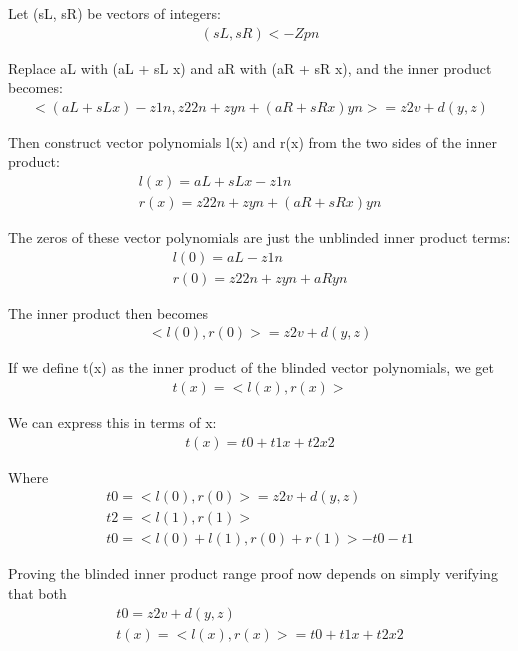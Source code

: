 \documentclass{article}
\begin{document}
Let (sL, sR) be vectors of integers:
\begin{eqnarray}
  (sL, sR) <- Zpn
\end{eqnarray}

Replace aL with (aL + sL x) and aR with (aR + sR x), and the inner product becomes:
\begin{eqnarray}
  <(aL + sL x) - z 1n, z2 2n + z yn + (aR+ sR x)yn> = z2 v + d(y,z)
\end{eqnarray}

Then construct vector polynomials l(x) and r(x) from the two sides of the inner product:
\begin{eqnarray}
  l(x) = aL + sL x - z 1n\\
  r(x) = z2 2n + z yn + (aR+ sR x)yn
\end{eqnarray}

The zeros of these vector polynomials are just the unblinded inner product terms:
\begin{eqnarray}
  l(0) = aL - z 1n\\
  r(0) = z2 2n + z yn + aRyn
\end{eqnarray}

The inner product then becomes
\begin{eqnarray}
  <l(0), r(0)> = z2 v + d(y,z)
\end{eqnarray}

If we define t(x) as the inner product of the blinded vector polynomials, we get
\begin{eqnarray}
  t(x) = <l(x), r(x)> 
\end{eqnarray}

We can express this in terms of x:
\begin{eqnarray}
  t(x) = t0 + t1 x + t2 x2
\end{eqnarray}

Where
\begin{eqnarray}
  t0 = <l(0), r(0)> = z2 v + d(y,z)\\
  t2 = <l(1), r(1)>\\
  t0 = <l(0) + l(1), r(0) + r(1)> - t0 - t1
\end{eqnarray}

Proving the blinded inner product range proof now depends on simply verifying that both 
\begin{eqnarray}
  t0 = z2 v + d(y,z)\\
  t(x) = <l(x), r(x)> = t0 + t1 x + t2 x2
\end{eqnarray}
\end{document}
